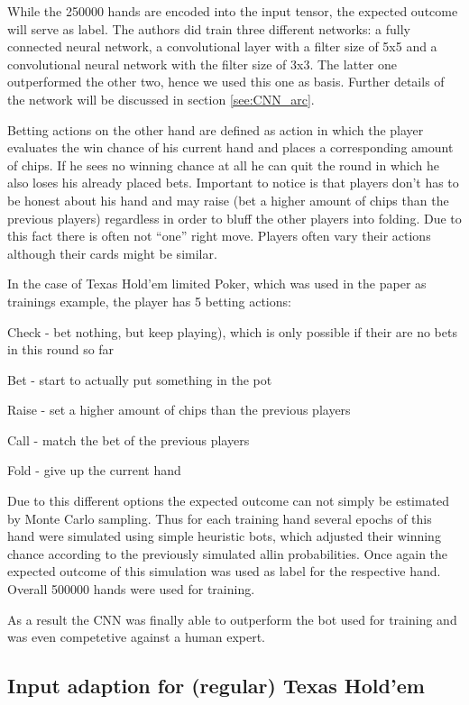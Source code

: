 \documentclass[]{report}
\begin{document}
While the 250000 hands are encoded into the input tensor, the expected
outcome will serve as label. The authors did train three different
networks: a fully connected neural network, a convolutional layer
with a filter size of 5x5 and a convolutional neural network with
the filter size of 3x3. The latter one outperformed the other two,
hence we used this one as basis. Further details of the network will
be discussed in section \ref{see:CNN_arc}. 

Betting actions on the other hand are defined as action in which the
player evaluates the win chance of his current hand and places a corresponding
amount of chips. If he sees no winning chance at all he can quit the
round in which he also loses his already placed bets. Important to
notice is that players don't has to be honest about his hand and may
raise (bet a higher amount of chips than the previous players) regardless
in order to bluff the other players into folding. Due to this fact
there is often not ``one'' right move. Players often vary their
actions although their cards might be similar. 

In the case of Texas Hold'em limited Poker, which was used in the
paper as trainings example, the player has 5 betting actions:

Check - bet nothing, but keep playing), which is only possible if
their are no bets in this round so far

Bet - start to actually put something in the pot

Raise - set a higher amount of chips than the previous players

Call - match the bet of the previous players

Fold - give up the current hand

Due to this different options the expected outcome can not simply
be estimated by Monte Carlo sampling. Thus for each training hand
several epochs of this hand were simulated using simple heuristic
bots, which adjusted their winning chance according to the previously
simulated allin probabilities. Once again the expected outcome of
this simulation was used as label for the respective hand. Overall
500000 hands were used for training. 

As a result the CNN was finally able to outperform the bot used for
training and was even competetive against a human expert.

\subsection{Input adaption for (regular) Texas Hold'em \label{see:adapted_p} }
\end{document}
